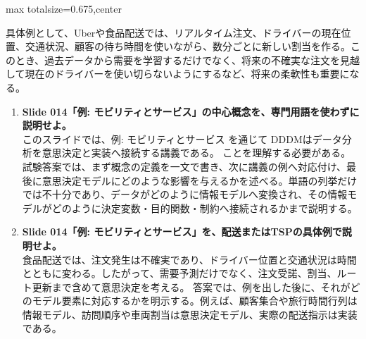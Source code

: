 \begin{adjustbox}{max totalsize={\textwidth}{0.675\textheight},center}
\begin{minipage}{\textwidth}
\begin{minipage}[t]{0.485\textwidth}
具体例として、Uberや食品配送では、リアルタイム注文、ドライバーの現在位置、交通状況、顧客の待ち時間を使いながら、数分ごとに新しい割当を作る。このとき、過去データから需要を学習するだけでなく、将来の不確実な注文を見越して現在のドライバーを使い切らないようにするなど、将来の柔軟性も重要になる。\par
{}
\begin{enumerate}
\item \textbf{Slide 014「例: モビリティとサービス」の中心概念を、専門用語を使わずに説明せよ。}\\このスライドでは、例: モビリティとサービス を通じて DDDMはデータ分析を意思決定と実装へ接続する講義である。 ことを理解する必要がある。試験答案では、まず概念の定義を一文で書き、次に講義の例へ対応付け、最後に意思決定モデルにどのような影響を与えるかを述べる。単語の列挙だけでは不十分であり、データがどのように情報モデルへ変換され、その情報モデルがどのように決定変数・目的関数・制約へ接続されるかまで説明する。
\item \textbf{Slide 014「例: モビリティとサービス」を、配送またはTSPの具体例で説明せよ。}\\食品配送では、注文発生は不確実であり、ドライバー位置と交通状況は時間とともに変わる。したがって、需要予測だけでなく、注文受諾、割当、ルート更新まで含めて意思決定を考える。 答案では、例を出した後に、それがどのモデル要素に対応するかを明示する。例えば、顧客集合や旅行時間行列は情報モデル、訪問順序や車両割当は意思決定モデル、実際の配送指示は実装である。
\end{enumerate}
\end{minipage}
\end{minipage}
\end{adjustbox}

